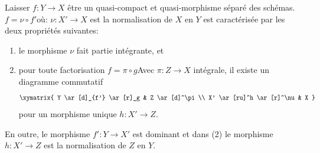 \begin{lemma}

\label{lemma-characterize-normalization}

Laisser $f : Y \to X$ être un quasi-compact et quasi-morphisme séparé des schémas. $f = \nu \circ f'$où: $\nu : X' \to X$ est la normalisation de $X$ en $Y$ est caractérisée par les deux propriétés suivantes:

\begin{enumerate}

\item le morphisme $\nu$ fait partie intégrante, et
\item pour toute factorisation $f = \pi \circ g$Avec $\pi : Z \to X$
intégrale, il existe un diagramme commutatif
$$
\xymatrix{
Y \ar[d]_{f'} \ar[r]_g & Z \ar[d]^\pi \\
X' \ar[ru]^h \ar[r]^\nu & X
}
$$
pour un morphisme unique $h : X' \to Z$.

\end{enumerate}

En outre, le morphisme $f' : Y \to X'$ est dominant et dans (2) le morphisme $h : X' \to Z$ est la normalisation de $Z$ en $Y$.

\end{lemma}

